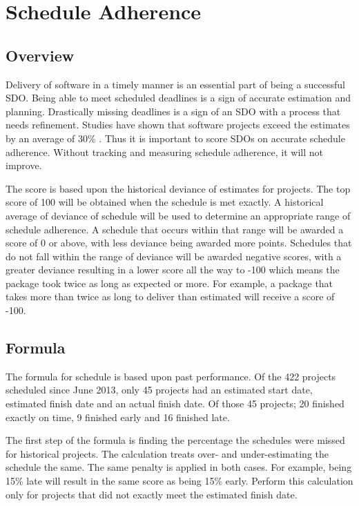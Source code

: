 \documentclass[SDSUThesis.tex]{subfiles}
\begin{document}
\section{Schedule Adherence}
    \subsection{Overview}
        Delivery of software in a timely manner is an essential part of being a 
        successful SDO.  Being able to meet scheduled deadlines is a sign of accurate
        estimation and planning.  Drastically missing deadlines is a sign of an SDO
        with a process that needs refinement.  Studies have shown that 
        software projects exceed the estimates by an average of
        30\% \cite{Jorgensen2014}.  Thus it is important to score SDOs on accurate
        schedule adherence. Without tracking and measuring schedule adherence, it will
        not improve.  
        
        The score is based upon the historical deviance of estimates for
        projects.  The top score of
        100 will be obtained when the schedule is met exactly.  A historical average 
        of deviance of schedule will be used to determine an appropriate range
        of schedule adherence.  A schedule that occurs within that range will be awarded
        a score of 0 or above, with less deviance being awarded more points.  Schedules
        that do not fall within the range of deviance will be awarded negative scores, 
        with a greater deviance resulting in a lower score all the way to -100 which means
        the package took twice as long as expected or more.
        For example, a package that takes more than twice as long to deliver than
        estimated will receive a score of -100.
    
    \newpage
    \subsection{Formula}
    
    The formula for schedule is based upon past performance.  Of the 422 projects
    scheduled since June 2013, only 45 projects had an estimated start date, estimated
    finish date and an actual finish date.  Of those 45 projects; 20 finished exactly on time,
    9 finished early and 16 finished late.  
    
    The first step of the formula is finding the percentage the schedules were missed for 
    historical projects.  The calculation treats over- and under-estimating the schedule
    the same.  The same penalty is applied in both cases.  For example, being 15\% late
    will result in the same score as being 15\% early. Perform this calculation
    only for projects that did not exactly meet the estimated finish date.
    
\end{document}
